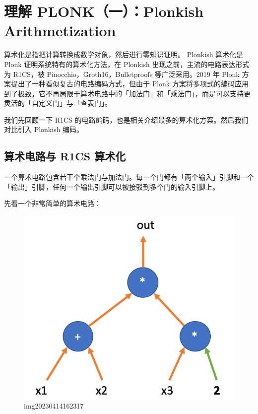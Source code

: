 
\section{理解 PLONK（一）：Plonkish
Arithmetization}\label{ux7406ux89e3-plonkux4e00plonkish-arithmetization}

算术化是指把计算转换成数学对象，然后进行零知识证明。 Plonkish 算术化是
Plonk 证明系统特有的算术化方法，在 Plonkish
出现之前，主流的电路表达形式为 R1CS，被 Pinocchio，Groth16，Bulletproofs
等广泛采用。2019 年 Plonk 方案提出了一种看似复古的电路编码方式，但由于
Plonk
方案将多项式的编码应用到了极致，它不再局限于算术电路中的「加法门」和「乘法门」，而是可以支持更灵活的「自定义门」与「查表门」。

我们先回顾一下 R1CS
的电路编码，也是相关介绍最多的算术化方案。然后我们对比引入 Plonkish
编码。

\hypertarget{ux7b97ux672fux7535ux8defux4e0e-r1cs-ux7b97ux672fux5316}{%
\subsection{算术电路与 R1CS
算术化}\label{ux7b97ux672fux7535ux8defux4e0e-r1cs-ux7b97ux672fux5316}}

一个算术电路包含若干个乘法门与加法门。每一个门都有「两个输入」引脚和一个「输出」引脚，任何一个输出引脚可以被接驳到多个门的输入引脚上。

先看一个非常简单的算术电路：

\begin{figure}
\centering
\includegraphics{img/img20230414162317.png}
\caption{img20230414162317}
\end{figure}

